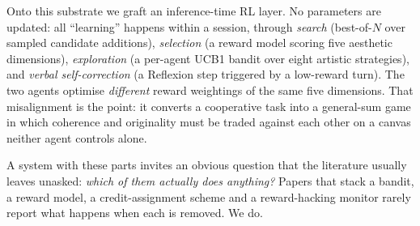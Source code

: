 \documentclass[11pt]{article}
\theoremstyle{plain}
\theoremstyle{definition}
\begin{document}
Onto this substrate we graft an inference-time RL layer. No parameters are
updated: all ``learning'' happens within a session, through \emph{search}
(best-of-$N$ over sampled candidate additions), \emph{selection} (a reward
model scoring five aesthetic dimensions), \emph{exploration} (a per-agent UCB1
bandit over eight artistic strategies), and \emph{verbal self-correction} (a
Reflexion step triggered by a low-reward turn). The two agents optimise
\emph{different} reward weightings of the same five dimensions. That
misalignment is the point: it converts a cooperative task into a general-sum
game in which coherence and originality must be traded against each other on a
canvas neither agent controls alone.

A system with these parts invites an obvious question that the literature
usually leaves unasked: \emph{which of them actually does anything?} Papers that
stack a bandit, a reward model, a credit-assignment scheme and a reward-hacking
monitor rarely report what happens when each is removed. We do.
\end{document}
